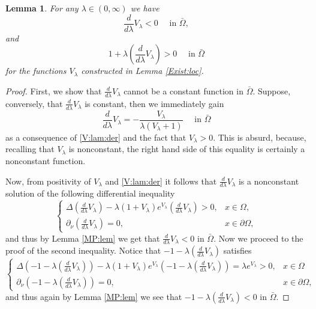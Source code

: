 \documentclass[12pt,a4paper]{amsart}
\newtheorem{lemma}[theorem]{Lemma}
\theoremstyle{definition}
\theoremstyle{remark}
\numberwithin{equation}{section}
\numberwithin{theorem}{section}
\begin{document}
\begin{lemma}\label{V:lem}
For any $\lambda\in(0,\infty)$ we have
\begin{equation}\label{V:pr:1}
 \frac{d}{d\lambda}V_{\lambda}<0\quad \text{ in }  \bar{\Omega},
\end{equation}
and
\begin{equation}\label{V:pr:2}
1+\lambda \left(\frac{d}{d\lambda}V_{\lambda}\right)>0\quad \text{ in }  \bar{\Omega}
\end{equation} 
for the functions $V_\lambda$ constructed in Lemma \ref{Exist:loc}.
\end{lemma}
\begin{proof}  First, we show that $\frac{d}{d\lambda}V_{\lambda}$ cannot be a constant function in $\bar{\Omega}.$ Suppose, conversely, that $\frac{d}{d\lambda}V_{\lambda}$ is constant, then we immediately gain 
$$
\frac{d}{d\lambda}V_{\lambda} = -\frac{V_\lambda}{\lambda(V_\lambda + 1)}  \quad \text{ in } \bar{\Omega}
$$ 
as a consequence of \eqref{V:lam:der} and the fact that $V_\lambda > 0$. This is absurd, because, recalling that $V_\lambda$ is nonconstant, the right hand side of this equality is certainly a nonconstant function. 

 Now, from positivity of $V_\lambda$ and \eqref{V:lam:der} it follows that $\frac{d}{d\lambda}V_{\lambda}$ is a  nonconstant solution of the following differential inequality
$$
\left\{\begin{array}{lr}
\Delta \left(\frac{d}{d\lambda}V_{\lambda}\right)-\lambda(1+V_\lambda)e^{V_\lambda}\left(\frac{d}{d\lambda}V_{\lambda}\right)>0,& x\in\Omega,\\
\partial_\nu \left(\frac{d}{d\lambda}V_{\lambda}\right)=0,& x\in\partial\Omega, 
\end{array}\right.
$$
and thus by Lemma \ref{MP:lem} we get that $\frac{d}{d\lambda}V_{\lambda}<0$ in $\bar{\Omega}.$ Now we proceed to the proof of the second inequality. Notice that $-1-\lambda \left(\frac{d}{d\lambda}V_{\lambda}\right)$ satisfies 
$$
\left\{\begin{array}{lr}
\Delta\left(-1-\lambda \left(\frac{d}{d\lambda}V_{\lambda}\right)\right)-\lambda(1+V_\lambda)e^{V_\lambda}\left(-1-\lambda \left(\frac{d}{d\lambda}V_{\lambda}\right)\right)=\lambda e^{V_\lambda}>0,&x\in\Omega\\
\partial_\nu \left(-1-\lambda \left(\frac{d}{d\lambda}V_{\lambda}\right)\right)=0,& x\in\partial\Omega,
\end{array}\right.
$$
and thus again by Lemma \ref{MP:lem} we see that $-1-\lambda \left(\frac{d}{d\lambda}V_{\lambda}\right)<0$ in $\bar{\Omega}.$


\end{proof}
\end{document}

